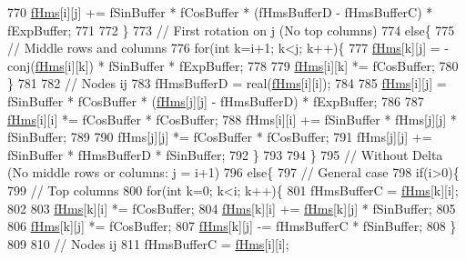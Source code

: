 \begin{DoxyCode}
770       \hyperlink{classOscProb_1_1PMNS__Base_adf5901166216e8c7a5cff2092952f473}{fHms}[i][j] += fSinBuffer * fCosBuffer * (fHmsBufferD - fHmsBufferC) * fExpBuffer;
771 
772     \}
773     \textcolor{comment}{// First rotation on j (No top columns)}
774     \textcolor{keywordflow}{else}\{
775       \textcolor{comment}{// Middle rows and columns}
776       \textcolor{keywordflow}{for}(\textcolor{keywordtype}{int} k=i+1; k<j; k++)\{
777         \hyperlink{classOscProb_1_1PMNS__Base_adf5901166216e8c7a5cff2092952f473}{fHms}[k][j] = -conj(\hyperlink{classOscProb_1_1PMNS__Base_adf5901166216e8c7a5cff2092952f473}{fHms}[i][k]) * fSinBuffer * fExpBuffer;
778 
779         \hyperlink{classOscProb_1_1PMNS__Base_adf5901166216e8c7a5cff2092952f473}{fHms}[i][k] *= fCosBuffer;
780       \}
781 
782       \textcolor{comment}{// Nodes ij}
783       fHmsBufferD = real(\hyperlink{classOscProb_1_1PMNS__Base_adf5901166216e8c7a5cff2092952f473}{fHms}[i][i]);
784 
785       \hyperlink{classOscProb_1_1PMNS__Base_adf5901166216e8c7a5cff2092952f473}{fHms}[i][j] = fSinBuffer * fCosBuffer * (\hyperlink{classOscProb_1_1PMNS__Base_adf5901166216e8c7a5cff2092952f473}{fHms}[j][j] - fHmsBufferD) * fExpBuffer;
786 
787       \hyperlink{classOscProb_1_1PMNS__Base_adf5901166216e8c7a5cff2092952f473}{fHms}[i][i] *= fCosBuffer * fCosBuffer;
788       fHms[i][i] += fSinBuffer * fHms[j][j] * fSinBuffer;
789 
790       fHms[j][j] *= fCosBuffer * fCosBuffer;
791       fHms[j][j] += fSinBuffer * fHmsBufferD * fSinBuffer;
792     \}
793 
794   \}
795   \textcolor{comment}{// Without Delta (No middle rows or columns: j = i+1)}
796   \textcolor{keywordflow}{else}\{
797     \textcolor{comment}{// General case}
798     \textcolor{keywordflow}{if}(i>0)\{
799       \textcolor{comment}{// Top columns}
800       \textcolor{keywordflow}{for}(\textcolor{keywordtype}{int} k=0; k<i; k++)\{
801         fHmsBufferC = \hyperlink{classOscProb_1_1PMNS__Base_adf5901166216e8c7a5cff2092952f473}{fHms}[k][i];
802 
803         \hyperlink{classOscProb_1_1PMNS__Base_adf5901166216e8c7a5cff2092952f473}{fHms}[k][i] *= fCosBuffer;
804         \hyperlink{classOscProb_1_1PMNS__Base_adf5901166216e8c7a5cff2092952f473}{fHms}[k][i] += \hyperlink{classOscProb_1_1PMNS__Base_adf5901166216e8c7a5cff2092952f473}{fHms}[k][j] * fSinBuffer;
805 
806         \hyperlink{classOscProb_1_1PMNS__Base_adf5901166216e8c7a5cff2092952f473}{fHms}[k][j] *= fCosBuffer;
807         \hyperlink{classOscProb_1_1PMNS__Base_adf5901166216e8c7a5cff2092952f473}{fHms}[k][j] -= fHmsBufferC * fSinBuffer;
808       \}
809 
810       \textcolor{comment}{// Nodes ij}
811       fHmsBufferC = \hyperlink{classOscProb_1_1PMNS__Base_adf5901166216e8c7a5cff2092952f473}{fHms}[i][i];

\end{DoxyCode}
